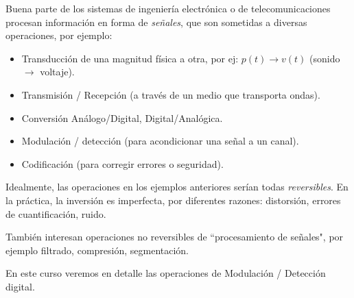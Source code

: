 

Buena parte de los sistemas de ingeniería electrónica o de
telecomunicaciones procesan información en forma de
\emph{señales}, que son sometidas a diversas operaciones, por
ejemplo:

\begin{itemize}
\item Transducción de una magnitud física a otra, por ej: $p(t)\rightarrow v(t)$ (sonido $\rightarrow$
voltaje).
\item Transmisión / Recepción (a través de un medio que transporta
ondas).
\item Conversión Análogo/Digital, Digital/Analógica.
\item Modulación / detección (para acondicionar una señal a un
canal).
\item Codificación  (para corregir errores o seguridad).
\end{itemize}
Idealmente, las operaciones en los ejemplos anteriores serían
todas \emph{reversibles}. En la práctica, la inversión es
imperfecta, por diferentes razones: distorsión, errores de
cuantificación, ruido.

También interesan operaciones no reversibles de ``procesamiento de
señales", por ejemplo filtrado,
compresión, segmentación.

En este curso veremos en detalle las operaciones de Modulación /
Detección digital.